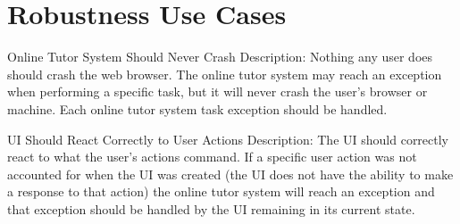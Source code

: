\chapter{Robustness Use Cases}
    \begin{section}{Online Tutor System Should Never Crash}
        Description: Nothing any user does should crash the web browser.  The online tutor system may 
        reach an exception when performing a specific task, but it will never crash the user's browser 
        or machine.  Each online tutor system task exception should be handled.
    \end{section}
    
    \begin{section}{UI Should React Correctly to User Actions}
        Description: The UI should correctly react to what the user's actions command.  
        If a specific user action was not accounted for when the UI was created (the UI does not have the 
        ability to make a response to that action) the online tutor system will reach an exception and that 
        exception should be handled by the UI remaining in its current state.
    \end{section}
    
